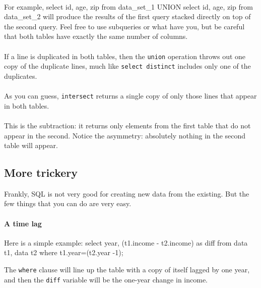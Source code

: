 \paragraph{} For example, 
select id, age, zip
from data_set_1
UNION
select id, age, zip
from data_set_2
will produce the results of the first query stacked directly on top of
the second query. Feel free to use subqueries or what have you, but be
careful that both tables have exactly the same number of columns.

\paragraph{} If a line is duplicated in both tables,
then the {\tt union} operation throws out
one copy of the duplicate lines, much like {\tt select distinct}
includes only one of the duplicates.

\paragraph{} As you can guess, {\tt intersect} returns
a single copy of only those lines that appear in both tables.

\paragraph{} This is the subtraction: it returns only
elements from the first table that do not appear in the second. Notice
the asymmetry: absolutely nothing in the second table will appear. 

\subsection{More trickery} Frankly, SQL is not very good for
creating new data from the existing. But the few things that you can do
are very easy.

\paragraph{A time lag} Here is a simple example:
select year, (t1.income - t2.income) as diff
   from data t1, data t2
   where t1.year=(t2.year -1);

The {\tt where} clause will line up the table with a copy of itself
lagged by one year, and then the {\tt diff} variable will be the
one-year change in income.



